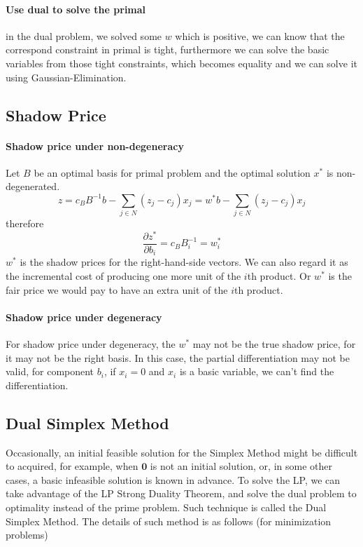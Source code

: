             \paragraph{Use dual to solve the primal}
                in the dual problem, we solved some $w$ which is positive, we can know that the correspond constraint in primal is tight, furthermore we can solve the basic variables from those tight constraints, which becomes equality and we can solve it using Gaussian-Elimination.

        \subsection{Shadow Price}
            \paragraph{Shadow price under non-degeneracy}
                Let $B$ be an optimal basis for primal problem and the optimal solution $x^*$ is non-degenerated.
                \begin{equation}
                    z=c_BB^{-1}b - \sum_{j\in N}(z_j - c_j)x_j = w^*b - \sum_{j\in N}(z_j - c_j)x_j \nonumber
                \end{equation}
                therefore
                \begin{equation}
                    \frac{\partial z^*}{\partial b_i} = c_BB^{-1}_i = w_i^* \nonumber
                \end{equation}
                $w^*$ is the shadow prices for the right-hand-side vectors. We can also regard it as the incremental cost of producing one more unit of the $i$th product. Or $w^*$ is the fair price we would pay to have an extra unit of the $i$th product.

            \paragraph{Shadow price under degeneracy}
                For shadow price under degeneracy, the $w^*$ may not be the true shadow price, for it may not be the right basis. In this case, the partial differentiation may not be valid, for component $b_i$, if $x_i = 0$ and $x_i$ is a basic variable, we can't find the differentiation.

        \subsection{Dual Simplex Method}
            Occasionally, an initial feasible solution for the Simplex Method might be difficult to acquired, for example, when $\mathbf{0}$ is not an initial solution, or, in some other cases, a basic infeasible solution is known in advance. To solve the LP, we can take advantage of the LP Strong Duality Theorem, and solve the dual problem to optimality instead of the prime problem. Such technique is called the Dual Simplex Method. The details of such method is as follows (for minimization problems)

